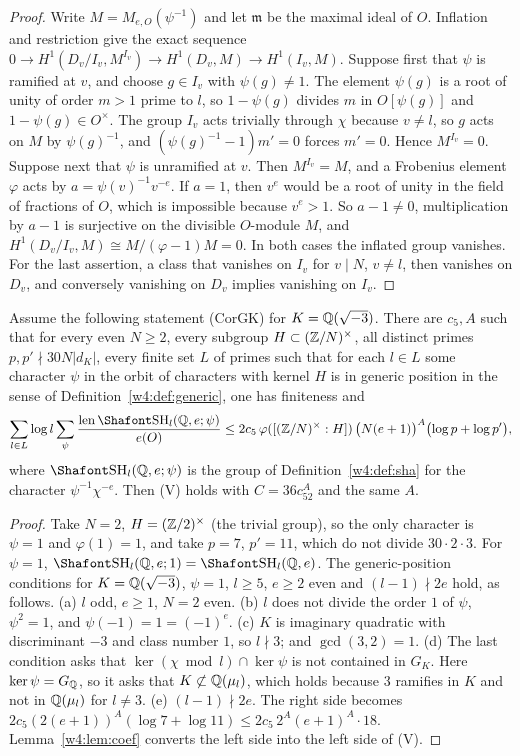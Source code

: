 \begin{proof}
Write $M=M_{e,O}(\psi^{-1})$ and let $\mathfrak m$ be the maximal ideal of $O$. Inflation and restriction give the exact sequence $0\to H^1(D_v/I_v,M^{I_v})\to H^1(D_v,M)\to H^1(I_v,M)$. Suppose first that $\psi$ is ramified at $v$, and choose $g\in I_v$ with $\psi(g)\ne1$. The element $\psi(g)$ is a root of unity of order $m>1$ prime to $l$, so $1-\psi(g)$ divides $m$ in $O[\psi(g)]$ and $1-\psi(g)\in O^\times$. The group $I_v$ acts trivially through $\chi$ because $v\ne l$, so $g$ acts on $M$ by $\psi(g)^{-1}$, and $(\psi(g)^{-1}-1)m'=0$ forces $m'=0$. Hence $M^{I_v}=0$. Suppose next that $\psi$ is unramified at $v$. Then $M^{I_v}=M$, and a Frobenius element $\varphi$ acts by $a=\psi(v)^{-1}v^{-e}$. If $a=1$, then $v^e$ would be a root of unity in the field of fractions of $O$, which is impossible because $v^e>1$. So $a-1\ne0$, multiplication by $a-1$ is surjective on the divisible $O$-module $M$, and $H^1(D_v/I_v,M)\cong M/(\varphi-1)M=0$. In both cases the inflated group vanishes. For the last assertion, a class that vanishes on $I_v$ for $v\mid N$, $v\ne l$, then vanishes on $D_v$, and conversely vanishing on $D_v$ implies vanishing on $I_v$.
\end{proof}

\begin{proposition}\label{w4:prop:corToBound}
Assume the following statement (CorGK) for $K=\mathbb Q(\sqrt{-3})$. There are $c_5,A$ such that for every even $N\ge2$, every subgroup $H\subset(\mathbb Z/N)^\times$, all distinct primes $p,p'\nmid30N\lvert d_K\rvert$, every finite set $L$ of primes such that for each $l\in L$ some character $\psi$ in the orbit of characters with kernel $H$ is in generic position in the sense of Definition~\ref{w4:def:generic}, one has finiteness and
\[
\sum_{l\in L}\log l\sum_{\psi}\frac{\len\Sha_l(\Q,e;\psi)}{e(O)}\le2c_5\,\varphi([(\Z/N)^\times:H])\,\bigl(N(e+1)\bigr)^A\bigl(\log p+\log p'\bigr),
\]
where $\Sha_l(\Q,e;\psi)$ is the group of Definition~\ref{w4:def:sha} for the character $\psi^{-1}\chi^{-e}$. Then (V) holds with $C=36c_52^A$ and the same $A$.
\end{proposition}

\begin{proof}
Take $N=2$, $H=(\mathbb Z/2)^\times$ (the trivial group), so the only character is $\psi=1$ and $\varphi(1)=1$, and take $p=7$, $p'=11$, which do not divide $30\cdot2\cdot3$. For $\psi=1$, $\Sha_l(\Q,e;1)=\Sha_l(\Q,e)$. The generic-position conditions for $K=\mathbb Q(\sqrt{-3})$, $\psi=1$, $l\ge5$, $e\ge2$ even and $(l-1)\nmid2e$ hold, as follows. (a) $l$ odd, $e\ge1$, $N=2$ even. (b) $l$ does not divide the order $1$ of $\psi$, $\psi^2=1$, and $\psi(-1)=1=(-1)^e$. (c) $K$ is imaginary quadratic with discriminant $-3$ and class number $1$, so $l\nmid3$; and $\gcd(3,2)=1$. (d) The last condition asks that $\ker(\chi\bmod l)\cap\ker\psi$ is not contained in $G_K$. Here $\ker\psi=G_\mathbb Q$, so it asks that $K\not\subset\mathbb Q(\mu_l)$, which holds because $3$ ramifies in $K$ and not in $\mathbb Q(\mu_l)$ for $l\ne3$. (e) $(l-1)\nmid2e$. The right side becomes $2c_5(2(e+1))^A(\log7+\log11)\le2c_5\,2^A(e+1)^A\cdot 18$. Lemma~\ref{w4:lem:coef} converts the left side into the left side of (V).
\end{proof}

